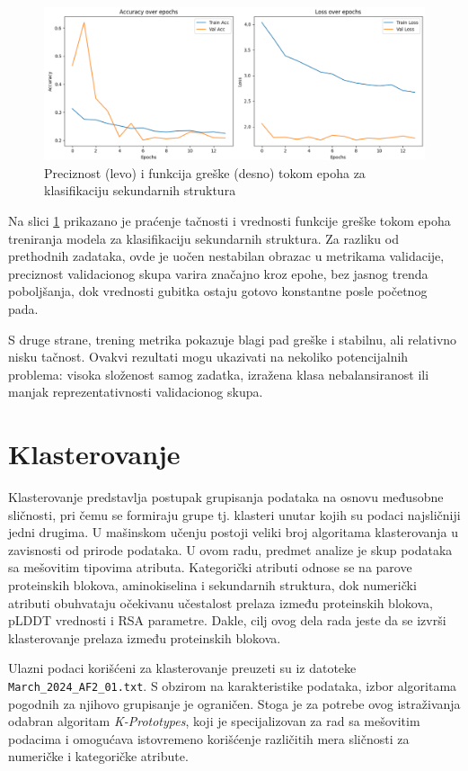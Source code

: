 \documentclass[a4paper,12pt]{article}
\begin{document}
\begin{figure}[htbp]
    \centering
    \includegraphics[width=1\textwidth]{images/epochs_ss.png}
    \caption{Preciznost (levo) i funkcija greške (desno) tokom epoha za klasifikaciju sekundarnih struktura}
    \label{fig:ss_accuracy_loss}
\end{figure}

Na slici \ref{fig:ss_accuracy_loss} prikazano je praćenje tačnosti i vrednosti funkcije greške tokom epoha treniranja modela za klasifikaciju sekundarnih struktura. Za razliku od prethodnih zadataka, ovde je uočen nestabilan obrazac u metrikama validacije, preciznost validacionog skupa varira značajno kroz epohe, bez jasnog trenda poboljšanja, dok vrednosti gubitka ostaju gotovo konstantne posle početnog pada.

S druge strane, trening metrika pokazuje blagi pad greške i stabilnu, ali relativno nisku tačnost. Ovakvi rezultati mogu ukazivati na nekoliko potencijalnih problema: visoka složenost samog zadatka, izražena klasa nebalansiranost ili manjak reprezentativnosti validacionog skupa.

\newpage
\section{Klasterovanje}
Klasterovanje predstavlja postupak grupisanja podataka na osnovu međusobne sličnosti, pri čemu se formiraju grupe tj. klasteri unutar kojih su podaci najsličniji jedni drugima. U mašinskom učenju postoji veliki broj algoritama klasterovanja u zavisnosti od prirode podataka. U ovom radu, predmet analize je skup podataka sa mešovitim tipovima atributa. Kategorički atributi odnose se na parove proteinskih blokova, aminokiselina i sekundarnih struktura, dok numerički atributi obuhvataju očekivanu učestalost prelaza između proteinskih blokova, pLDDT vrednosti i RSA parametre. Dakle, cilj ovog dela rada jeste da se izvrši klasterovanje prelaza između proteinskih blokova.

Ulazni podaci korišćeni za klasterovanje preuzeti su iz datoteke \\\texttt{March\_2024\_AF2\_01.txt}.
S obzirom na karakteristike podataka, izbor algoritama pogodnih za njihovo grupisanje je ograničen. Stoga je za potrebe ovog istraživanja odabran algoritam \textit{K-Prototypes}, koji je specijalizovan za rad sa mešovitim podacima i omogućava istovremeno korišćenje različitih mera sličnosti za numeričke i kategoričke atribute.
\end{document}
